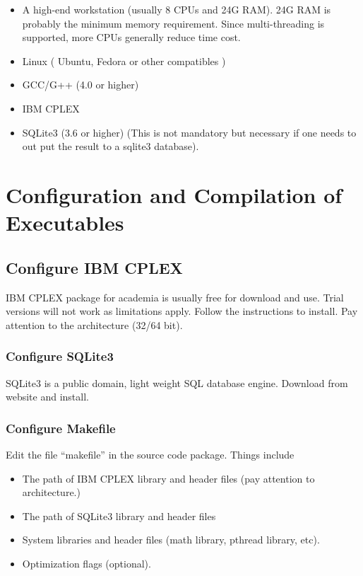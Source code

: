 \documentclass{article}
\begin{document}
\begin{itemize}

\item A high-end workstation (usually 8 CPUs and 
24G RAM). 24G RAM is probably the minimum memory 
requirement. Since multi-threading is supported, 
more CPUs generally reduce time cost.

\item Linux ( Ubuntu, Fedora or other compatibles )

\item GCC/G++ (4.0 or higher)

\item IBM CPLEX

\item SQLite3 (3.6 or higher) (This is not mandatory 
but necessary if one needs to out put the result to
a sqlite3 database).

\end{itemize}


\section{Configuration and Compilation of Executables}

\subsection{Configure IBM CPLEX}

IBM CPLEX package for academia is usually free for download 
and use. Trial versions will not work as limitations apply. 
Follow the instructions to install. Pay attention to the 
architecture (32/64 bit).


\subsubsection{Configure SQLite3}

SQLite3 is a public domain, light weight SQL database engine. 
Download from website and install.


\subsubsection{Configure Makefile}

Edit the file “makefile” in the source code package. 
Things include

\begin{itemize}

\item The path of IBM CPLEX library and header files 
(pay attention to architecture.)

\item The path of SQLite3 library and header files

\item System libraries and header files (math library, 
pthread library, etc).

\item Optimization flags (optional).

\end{itemize}
\end{document}
